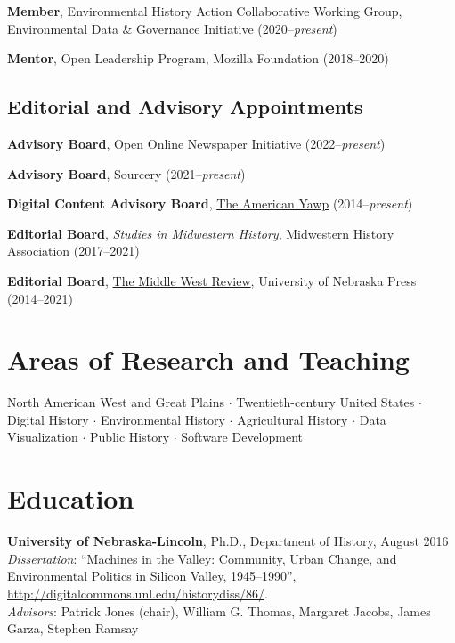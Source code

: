 \documentclass[10pt]{article}
\begin{document}
\textbf{Member}, Environmental History Action Collaborative Working Group, Environmental Data \& Governance Initiative (2020--\textit{present})

\textbf{Mentor}, Open Leadership Program, Mozilla Foundation (2018--2020)

\subsection*{Editorial and Advisory Appointments}

\textbf{Advisory Board}, Open Online Newspaper Initiative (2022--\textit{present})

\textbf{Advisory Board}, Sourcery (2021--\textit{present})

\textbf{Digital Content Advisory Board}, \href{http://www.americanyawp.com/}{The American Yawp} (2014--\textit{present})

\textbf{Editorial Board}, \textit{Studies in Midwestern History}, Midwestern History Association (2017--2021)

\textbf{Editorial Board}, \href{https://uimiddle.wordpress.com/}{The Middle West Review}, University of Nebraska Press (2014--2021)


\section*{Areas of Research and Teaching}

North American West and Great Plains $\cdot$ Twentieth-century United States $\cdot$ Digital History $\cdot$ Environmental History $\cdot$ Agricultural History $\cdot$ Data Visualization $\cdot$ Public History $\cdot$ Software Development


\section*{Education}

\textbf{University of Nebraska-Lincoln}, Ph.D., Department of History, August 2016 \\
\textit{Dissertation}: ``Machines in the Valley: Community, Urban Change, and Environmental Politics in Silicon Valley, 1945--1990'', \url{http://digitalcommons.unl.edu/historydiss/86/}. \\
\textit{Advisors}: Patrick Jones (chair), William G. Thomas, Margaret Jacobs, James Garza, Stephen Ramsay
\end{document}

